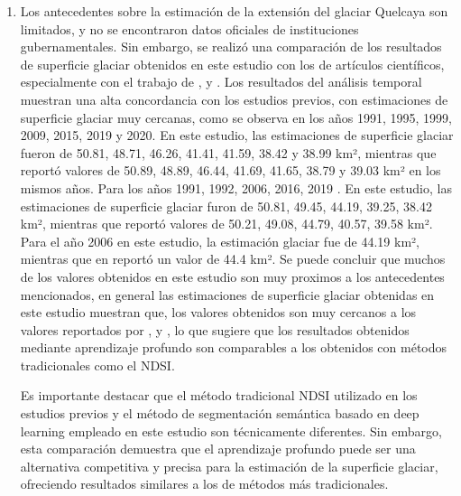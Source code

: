 \begin{enumerate}
	\item Los antecedentes sobre la estimación de la extensión del glaciar Quelcaya son limitados, y no se encontraron datos oficiales de instituciones gubernamentales. Sin embargo, se realizó una comparación de los resultados de superficie glaciar obtenidos en este estudio con los de artículos científicos, especialmente con el trabajo de \parencite{malone2022evolution}, \parencite{taylor2022multi} y \parencite{hanshaw2014glacial}. Los resultados del análisis temporal muestran una alta concordancia con los estudios previos, con estimaciones de superficie glaciar muy cercanas, como se observa en los años 1991, 1995, 1999, 2009, 2015, 2019 y 2020. En este estudio, las estimaciones de superficie glaciar fueron de 50.81, 48.71, 46.26, 41.41, 41.59, 38.42 y 38.99 km², mientras que \parencite{malone2022evolution} reportó valores de 50.89, 48.89, 46.44, 41.69, 41.65, 38.79 y 39.03 km² en los mismos años. Para los años 1991, 1992, 2006, 2016, 2019 . En este estudio, las estimaciones de superficie glaciar furon de 50.81, 49.45, 44.19, 39.25, 38.42 km², mientras que \parencite{taylor2022multi} reportó valores de 50.21, 49.08, 44.79, 40.57, 39.58 km². Para el año 2006 en este estudio, la estimación glaciar fue de 44.19 km², mientras que en \parencite{hanshaw2014glacial} reportó un valor de 44.4 km². Se puede concluir que muchos de los valores obtenidos en este estudio son muy proximos a los antecedentes mencionados, en general las estimaciones de superficie glaciar obtenidas en este estudio muestran que, los valores obtenidos son muy cercanos a los valores reportados por \parencite{malone2022evolution}, \parencite{taylor2022multi} y \parencite{hanshaw2014glacial}, lo que sugiere que los resultados obtenidos mediante aprendizaje profundo son comparables a los obtenidos con métodos tradicionales como el NDSI. 
	
	Es importante destacar que el método tradicional NDSI utilizado en los estudios previos y el método de segmentación semántica basado en deep learning empleado en este estudio son técnicamente diferentes. Sin embargo, esta comparación demuestra que el aprendizaje profundo puede ser una alternativa competitiva y precisa para la estimación de la superficie glaciar, ofreciendo resultados similares a los de métodos más tradicionales.
\end{enumerate}

\singlespacing

